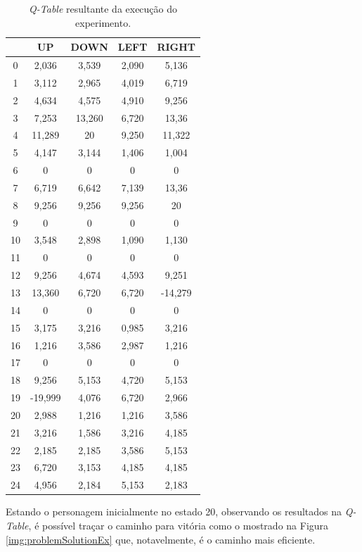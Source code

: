 \begin{table}[!htb]
    \centering
    \begin{tabular}{c|c|c|c|c}
            & UP        & DOWN      & LEFT      & RIGHT     \\ \hline
        0   & 2,036     & 3,539     & 2,090     & 5,136     \\
        1   & 3,112     & 2,965     & 4,019     & 6,719     \\
        2   & 4,634     & 4,575     & 4,910     & 9,256     \\
        3   & 7,253     & 13,260    & 6,720     & 13,36     \\
        4   & 11,289    & 20        & 9,250     & 11,322    \\
        5   & 4,147     & 3,144     & 1,406     & 1,004     \\
        6   & 0         & 0         & 0         & 0         \\
        7   & 6,719     & 6,642     & 7,139     & 13,36     \\
        8   & 9,256     & 9,256     & 9,256     & 20        \\
        9   & 0         & 0         & 0         & 0         \\
        10  & 3,548     & 2,898     & 1,090     & 1,130     \\
        11  & 0         & 0         & 0         & 0         \\
        12  & 9,256     & 4,674     & 4,593     &  9,251    \\
        13  & 13,360    & 6,720     & 6,720     & -14,279   \\
        14  & 0         & 0         & 0         & 0         \\
        15  & 3,175     & 3,216     & 0,985     & 3,216     \\
        16  & 1,216     & 3,586     & 2,987     & 1,216     \\
        17  & 0         & 0         & 0         & 0         \\
        18  & 9,256     & 5,153     & 4,720     & 5,153     \\
        19  & -19,999   & 4,076     & 6,720     & 2,966     \\
        20  & 2,988     & 1,216     & 1,216     & 3,586     \\
        21  & 3,216     & 1,586     & 3,216     & 4,185     \\
        22  & 2,185     & 2,185     & 3,586     & 5,153     \\
        23  & 6,720     & 3,153     & 4,185     & 4,185     \\
        24  & 4,956     & 2,184     & 5,153     & 2,183     \\
    \end{tabular}
    \caption{\textit{Q-Table} resultante da execução do experimento.}
    \label{tab:QtableEx}
\end{table}


Estando o personagem inicialmente no estado 20, observando os resultados na \textit{Q-Table}, é
possível traçar o caminho para vitória como o mostrado na Figura \ref{img:problemSolutionEx} que,
notavelmente, é o caminho mais eficiente.
